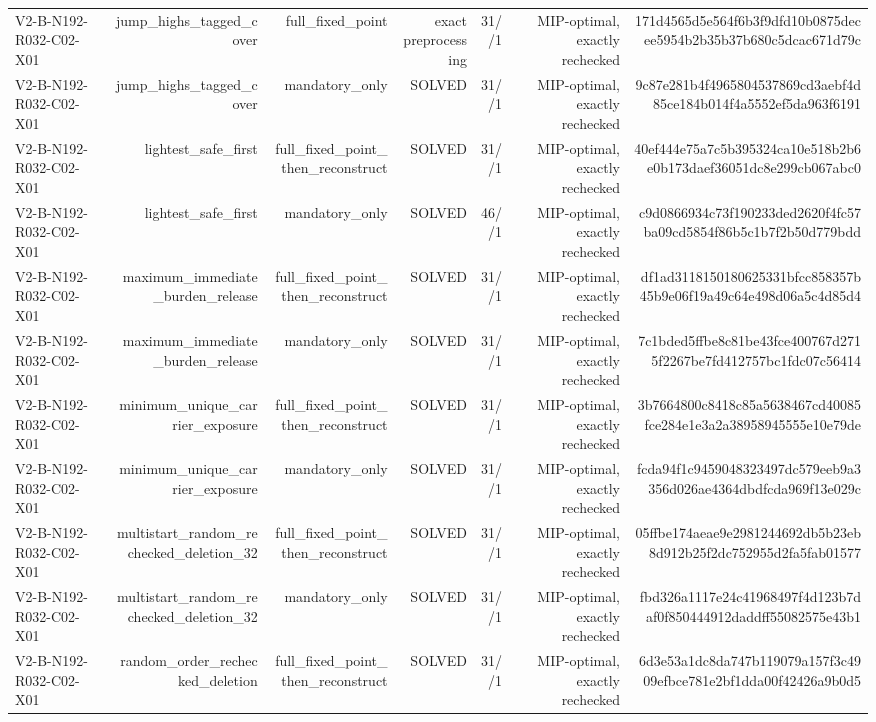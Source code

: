 {\begin{longtable}{lrrrrrr}
V2-B-N192-R032-C02-X01 & jump\_highs\_tagged\_cover & full\_fixed\_point & exact preprocessing & 31//1 & MIP-optimal, exactly rechecked & 171d4565d5e564f6b3f9dfd10b0875decee5954b2b35b37b680c5dcac671d79c \\
V2-B-N192-R032-C02-X01 & jump\_highs\_tagged\_cover & mandatory\_only & SOLVED & 31//1 & MIP-optimal, exactly rechecked & 9c87e281b4f4965804537869cd3aebf4d85ce184b014f4a5552ef5da963f6191 \\
V2-B-N192-R032-C02-X01 & lightest\_safe\_first & full\_fixed\_point\_then\_reconstruct & SOLVED & 31//1 & MIP-optimal, exactly rechecked & 40ef444e75a7c5b395324ca10e518b2b6e0b173daef36051dc8e299cb067abc0 \\
V2-B-N192-R032-C02-X01 & lightest\_safe\_first & mandatory\_only & SOLVED & 46//1 & MIP-optimal, exactly rechecked & c9d0866934c73f190233ded2620f4fc57ba09cd5854f86b5c1b7f2b50d779bdd \\
V2-B-N192-R032-C02-X01 & maximum\_immediate\_burden\_release & full\_fixed\_point\_then\_reconstruct & SOLVED & 31//1 & MIP-optimal, exactly rechecked & df1ad3118150180625331bfcc858357b45b9e06f19a49c64e498d06a5c4d85d4 \\
V2-B-N192-R032-C02-X01 & maximum\_immediate\_burden\_release & mandatory\_only & SOLVED & 31//1 & MIP-optimal, exactly rechecked & 7c1bded5ffbe8c81be43fce400767d2715f2267be7fd412757bc1fdc07c56414 \\
V2-B-N192-R032-C02-X01 & minimum\_unique\_carrier\_exposure & full\_fixed\_point\_then\_reconstruct & SOLVED & 31//1 & MIP-optimal, exactly rechecked & 3b7664800c8418c85a5638467cd40085fce284e1e3a2a38958945555e10e79de \\
V2-B-N192-R032-C02-X01 & minimum\_unique\_carrier\_exposure & mandatory\_only & SOLVED & 31//1 & MIP-optimal, exactly rechecked & fcda94f1c9459048323497dc579eeb9a3356d026ae4364dbdfcda969f13e029c \\
V2-B-N192-R032-C02-X01 & multistart\_random\_rechecked\_deletion\_32 & full\_fixed\_point\_then\_reconstruct & SOLVED & 31//1 & MIP-optimal, exactly rechecked & 05ffbe174aeae9e2981244692db5b23eb8d912b25f2dc752955d2fa5fab01577 \\
V2-B-N192-R032-C02-X01 & multistart\_random\_rechecked\_deletion\_32 & mandatory\_only & SOLVED & 31//1 & MIP-optimal, exactly rechecked & fbd326a1117e24c41968497f4d123b7daf0f850444912daddff55082575e43b1 \\
V2-B-N192-R032-C02-X01 & random\_order\_rechecked\_deletion & full\_fixed\_point\_then\_reconstruct & SOLVED & 31//1 & MIP-optimal, exactly rechecked & 6d3e53a1dc8da747b119079a157f3c4909efbce781e2bf1dda00f42426a9b0d5 \\

\end{longtable}}
